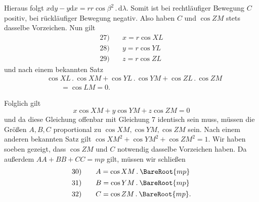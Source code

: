 \par Hieraus folgt \(x\mathrm{d}y-y\mathrm{d}x=rr\cos\beta^2\mathbin{.}\mathrm{d}\lambda\). Somit ist bei rechtläufiger Bewegung \(C\) positiv, bei rückläufiger Bewegung negativ. Also haben \(C\) und \(\cos ZM\) stets dasselbe Vorzeichen. Nun gilt
\[
\begin{array}{rl}
27)\quad&x=r\cos XL\\[4pt]
28)\quad&y=r\cos YL\\[4pt]
29)\quad&z=r\cos ZL
\end{array}
\]
und nach einem bekannten Satz
\[
\begin{aligned}
&\cos XL\mathbin{.}\cos XM+\cos YL\mathbin{.}\cos YM+\cos ZL\mathbin{.}\cos ZM\\
&\qquad=\cos LM=0.
\end{aligned}
\]
\par Folglich gilt
\[
x\cos XM+y\cos YM+z\cos ZM=0
\]
und da diese Gleichung offenbar mit Gleichung 7 identisch sein muss, müssen die Größen \(A,B,C\) proportional zu \(\cos XM,\cos YM,\cos ZM\) sein. Nach einem anderen bekannten Satz gilt \(\cos XM^2+\cos YM^2+\cos ZM^2=1\). Wir haben soeben gezeigt, dass \(\cos ZM\) und \(C\) notwendig dasselbe Vorzeichen haben. Da außerdem \(AA+BB+CC=mp\) gilt, müssen wir schließen
\[
\begin{array}{rl}
30)\quad&A=\cos XM\mathbin{.}\BareRoot{mp}\\[4pt]
31)\quad&B=\cos YM\mathbin{.}\BareRoot{mp}\\[4pt]
32)\quad&C=\cos ZM\mathbin{.}\BareRoot{mp}.
\end{array}
\]
